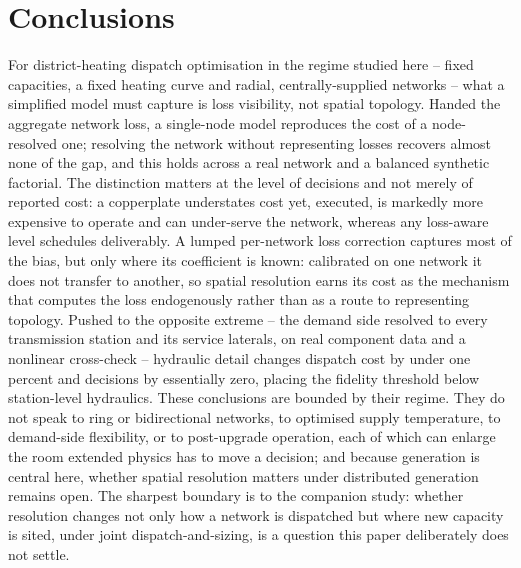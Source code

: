 \documentclass[a4paper,fleqn]{cas-dc}
\begin{document}
\section{Conclusions}
\label{sec:conclusion}
For district-heating dispatch optimisation in the regime studied here -- fixed capacities,
a fixed heating curve and radial, centrally-supplied networks -- what a simplified model
must capture is loss visibility, not spatial topology. Handed the aggregate network loss, a
single-node model reproduces the cost of a node-resolved one; resolving the network without
representing losses recovers almost none of the gap, and this holds across a real network
and a balanced synthetic factorial. The distinction matters at the level of decisions and
not merely of reported cost: a copperplate understates cost yet, executed, is markedly more
expensive to operate and can under-serve the network, whereas any loss-aware level schedules
deliverably. A lumped per-network loss correction captures most of the bias, but only where
its coefficient is known: calibrated on one network it does not transfer to another, so
spatial resolution earns its cost as the mechanism that computes the loss endogenously rather
than as a route to representing topology. Pushed to the opposite extreme -- the demand side
resolved to every transmission station and its service laterals, on real component data and a
nonlinear cross-check -- hydraulic detail changes dispatch cost by under one percent and
decisions by essentially zero, placing the fidelity threshold below station-level hydraulics.
These conclusions are bounded by their regime. They do not speak to ring or bidirectional
networks, to optimised supply temperature, to demand-side flexibility, or to post-upgrade
operation, each of which can enlarge the room extended physics has to move a decision; and
because generation is central here, whether spatial resolution matters under distributed
generation remains open. The sharpest boundary is to the companion study: whether resolution
changes not only how a network is dispatched but where new capacity is sited, under joint
dispatch-and-sizing, is a question this paper deliberately does not settle.
\end{document}
